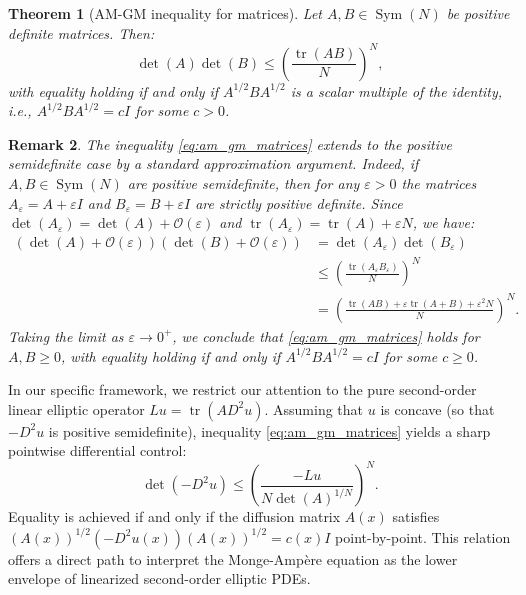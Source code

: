 \documentclass[10pt,a4paper]{amsart}
\newtheorem{theorem}{Theorem}[section]
\newtheorem{remark}[theorem]{Remark}
\numberwithin{equation}{section}
\begin{document}
\begin{theorem}[AM-GM inequality for matrices]
Let $A, B \in \operatorname{Sym}(N)$ be positive definite matrices. Then:
\begin{equation}\label{eq:am_gm_matrices}
\det(A)\det(B) \le \left(\frac{\operatorname{tr}(AB)}{N}\right)^N,
\end{equation}
with equality holding if and only if $A^{1/2}BA^{1/2}$ is a scalar multiple of the identity, i.e., $A^{1/2}BA^{1/2}=cI$ for some $c > 0$.
\end{theorem}

\begin{remark}
The inequality \eqref{eq:am_gm_matrices} extends to the positive semidefinite case by a standard approximation argument.
Indeed, if $A, B \in \operatorname{Sym}(N)$ are positive semidefinite, then for any $\varepsilon > 0$ the matrices $A_\varepsilon = A + \varepsilon I$ and $B_\varepsilon = B + \varepsilon I$ are strictly positive definite. Since $\det(A_\varepsilon) = \det(A) + \mathcal{O}(\varepsilon)$ and $\operatorname{tr}(A_\varepsilon) = \operatorname{tr}(A) + \varepsilon N$, we have:
\[
\begin{aligned}
\left( \det(A) + \mathcal{O}(\varepsilon) \right) \left( \det(B) + \mathcal{O}(\varepsilon) \right) &= \det(A_\varepsilon)\det(B_\varepsilon) \\
&\le \left(\frac{\operatorname{tr}(A_\varepsilon B_\varepsilon)}{N}\right)^N \\
&= \left(\frac{\operatorname{tr}(AB)+\varepsilon\operatorname{tr}(A+B)+\varepsilon^2 N}{N}\right)^N.
\end{aligned}
\]
Taking the limit as $\varepsilon \to 0^+$, we conclude that \eqref{eq:am_gm_matrices} holds for $A, B \ge 0$, with equality holding if and only if $A^{1/2}BA^{1/2} = cI$ for some $c \ge 0$.
\end{remark}

\noindent In our specific framework, we restrict our attention to the pure second-order linear elliptic operator $Lu = \operatorname{tr}(AD^2u)$. Assuming that $u$ is concave (so that $-D^2u$ is positive semidefinite), inequality \eqref{eq:am_gm_matrices} yields a sharp pointwise differential control:
\begin{equation}\label{eq:pointwise_ma_linear}
\det(-D^2u) \le \left(\frac{-Lu}{N\det(A)^{1/N}}\right)^N.
\end{equation}
Equality is achieved if and only if the diffusion matrix $A(x)$ satisfies $(A(x))^{1/2}(-D^2u(x))(A(x))^{1/2} = c(x)I$ point-by-point. This relation offers a direct path to interpret the Monge-Ampère equation as the lower envelope of linearized second-order elliptic PDEs.
\end{document}
